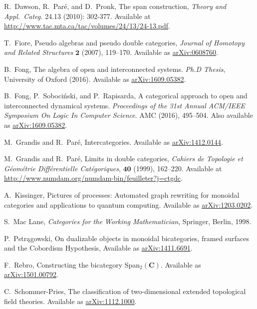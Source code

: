 \documentclass[11pt]{amsart}
\newcommand{\cat}[1]{\mathbf{#1}}
\theoremstyle{remark}
\theoremstyle{definition}
\begin{document}
\begin{thebibliography}{100}
R.~Dawson, R.~Par\'{e}, and D.~Pronk, 
The span construction, 
\emph{Theory and Appl.~Categ.} 
24.13 (2010): 302-377.
Available at \href{http://www.tac.mta.ca/tac/volumes/24/13/24-13.pdf}{http://www.tac.mta.ca/tac/volumes/24/13/24-13.pdf}.

T.~Fiore, 
Pseudo algebras and pseudo double categories, 
\emph{Journal of Homotopy and Related Structures} $\mathbf{2}$ 
(2007), 119--170. 
Available as \href{http://arxiv.org/abs/math/0608760}{arXiv:0608760}.

B.~Fong,
The algebra of open and interconnected systems.
\emph{Ph.D Thesis},
University of Oxford (2016).
Available as \href{https://arxiv.org/abs/1609.05382}{arXiv:1609.05382}.

B.~Fong, P.~Soboci\'{n}ski, and P.~Rapisarda,
A categorical approach to open and interconnected dynamical systems.
\emph{Proceedings of the 31st Annual ACM/IEEE Symposium On Logic In Computer Science}.
AMC (2016), 495--504.
Also available as \href{https://arxiv.org/abs/1609.05382}{arXiv:1609.05382}.

M.~Grandis and R.~Par\'{e}, 
Intercategories.
Available as \href{https://arxiv.org/abs/1412.0144}{arXiv:1412.0144}.

M.~Grandis and R.~Par\'{e}, 
Limits in double categories, 
\emph{Cahiers de Topologie et G\'{e}om\'{e}trie Diff\'{e}rentielle Cat\'{e}goriques}, $\mathbf{40}$  
(1999), 162--220. 
Available at \href{http://www.numdam.org/numdam-bin/feuilleter?j=ctgdc}{http://www.numdam.org/numdam-bin/feuilleter?j=ctgdc}.

A.~Kissinger,
Pictures of processes: Automated 
graph rewriting for monoidal categories 
and applications to quantum computing.
Available as \href{https://arxiv.org/abs/1203.0202}{arXiv:1203.0202}.

S.~Mac Lane, 
\emph{Categories for the Working Mathematician},
Springer, Berlin, 1998.

P.~Pstrągowski,
On dualizable objects in monoidal bicategories, framed surfaces and the Cobordism Hypothesis, 
Available as \href{https://arxiv.org/abs/1411.6691}{arXiv:1411.6691}.

F.~Rebro, 
Constructing the bicategory Span$_{2}(\cat{C})$. 
Available as \href{https://arxiv.org/abs/1501.00792}{arXiv:1501.00792}.

C.~Schommer-Pries,
The classification of two-dimensional extended topological field theories. 
Available as \href{https://arxiv.org/abs/1112.1000}{arXiv:1112.1000}.


\end{thebibliography}
\end{document}
